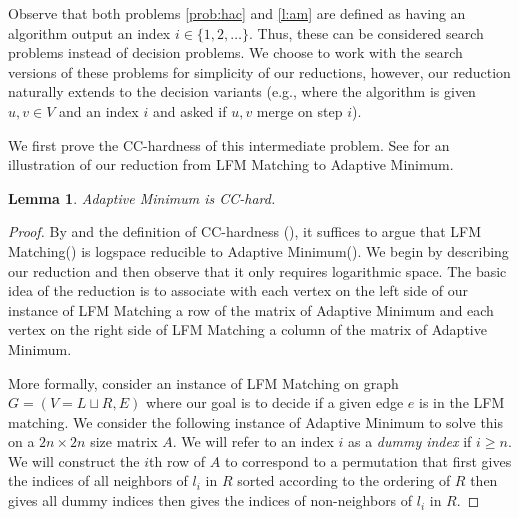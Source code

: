 \documentclass[11pt]{article}
\newcommand{\am}{\textsf{Adaptive Minimum}\xspace}
\newcommand{\lfm}{\textsf{LFM Matching}\xspace}
\newcommand{\CC}{\textsc{CC}\xspace}
\newtheorem{lemma}{Lemma}
\begin{document}
Observe that both problems \ref{prob:hac} and \ref{l:am} are defined as having an algorithm output an index $i \in \{1,2,\dots\}$. Thus, these can be considered search problems instead of decision problems. We choose to work with the search versions of these problems for simplicity of our reductions, however, our reduction naturally extends to the decision variants  (e.g., where the algorithm is given $u,v \in V$ and an index $i$ and asked if $u,v$ merge on step $i$). 

We first prove the \CC-hardness of this intermediate problem. See  for an illustration of our reduction from \lfm to \am.
\begin{lemma}
\am is \CC-hard.
\end{lemma}
\begin{proof}
    By  and the definition of \CC-hardness (), it suffices to argue that \lfm () is logspace reducible to \am ().
    We begin by describing our reduction and then observe that it only requires logarithmic space. The basic idea of the reduction is to associate with each vertex on the left side of our instance of \lfm a row of the matrix of \am and each vertex on the right side of \lfm a column of the matrix of \am.

    More formally, consider an instance of \lfm on graph $G = (V = L \sqcup R, E)$ where our goal is to decide if a given edge $e$ is in the LFM matching. 
    We consider the following instance of \am to solve this on a $2n \times 2n$ size matrix $A$. We will refer to an index $i$ as a \emph{dummy index} if $i \geq n$. We will construct the $i$th row of $A$ to correspond to a permutation that first gives the indices of all neighbors of $l_i$ in $R$ sorted according to the ordering of $R$ then gives all dummy indices then gives the indices of non-neighbors of $l_i$ in $R$. 
    

\end{proof}
\end{document}
